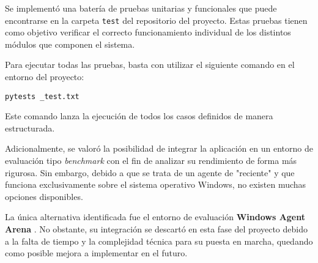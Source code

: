 Se implementó una batería de pruebas unitarias y funcionales que puede encontrarse en la carpeta \texttt{test} del repositorio del proyecto. Estas pruebas tienen como objetivo verificar el correcto funcionamiento individual de los distintos módulos que componen el sistema.

Para ejecutar todas las pruebas, basta con utilizar el siguiente comando en el entorno del proyecto:

\texttt{pytests \@master\_test.txt}

Este comando lanza la ejecución de todos los casos definidos de manera estructurada.

Adicionalmente, se valoró la posibilidad de integrar la aplicación en un entorno de evaluación tipo \textit{benchmark} con el fin de analizar su rendimiento de forma más rigurosa. Sin embargo, debido a que se trata de un agente de "reciente" y que funciona exclusivamente sobre el sistema operativo Windows, no existen muchas opciones disponibles.

La única alternativa identificada fue el entorno de evaluación \textbf{Windows Agent Arena} \cite{Bonatti2024WindowsAgentArena}. No obstante, su integración se descartó en esta fase del proyecto debido a la falta de tiempo y la complejidad técnica para su puesta en marcha, quedando como posible mejora a implementar en el futuro.
